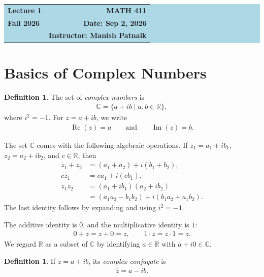 \documentclass[11pt]{article}
\theoremstyle{plain}
\theoremstyle{definition}
\newtheorem{definition}[theorem]{Definition}
\theoremstyle{remark}
\numberwithin{equation}{section}
\newcommand{\be}{\begin{eqnarray}}
\newcommand{\ee}{\end{eqnarray}}
\newcommand{\C}{\mathbb{C}}
\newcommand{\R}{\mathbb{R}}
\newcommand{\RePart}{\operatorname{Re}}
\newcommand{\ImPart}{\operatorname{Im}}
\begin{document}
\begin{center}
  \colorbox{lightblue}{%
    \begin{minipage}{0.94\textwidth}
      \vspace{0.55em}
      \begin{tabular*}{\textwidth}{@{\extracolsep{\fill}}lr}
        {\color{courseblue}\bfseries\LARGE Lecture 1} &
        {\color{courseblue}\bfseries\LARGE MATH 411}\\[0.35em]
        \textbf{Fall 2026} & \textbf{Date: Sep 2, 2026}\\
        & \textbf{Instructor: Manish Patnaik}
      \end{tabular*}
      \vspace{0.45em}
    \end{minipage}}
\end{center}

\tableofcontents
\vspace{0.45em}



\section{Basics of Complex Numbers}


\begin{definition}
The set of \emph{complex numbers} is
\be
  \C=\{a+ib\mid a,b\in\R\},
\ee
where $i^2=-1$.  For $z=a+ib$, we write
\be
  \RePart(z)=a \qquad\text{and}\qquad \ImPart(z)=b.
\ee
\end{definition}

The set $\C$ comes with the following algebraic operations.  If
$z_1=a_1+ib_1$, $z_2=a_2+ib_2$, and $c\in\R$, then
\begin{align}
  z_1+z_2
    &= (a_1+a_2)+i(b_1+b_2),\\
  c z_1
    &= ca_1+i(cb_1),\\
  z_1z_2
    &= (a_1+ib_1)(a_2+ib_2)\\
    &= (a_1a_2-b_1b_2)+i(b_1a_2+a_1b_2).
\end{align}
The last identity follows by expanding and using $i^2=-1$.

The additive identity is $0$, and the multiplicative identity is $1$:
\be
  0+z=z+0=z,
  \qquad
  1\cdot z=z\cdot 1=z.
\ee
We regard $\R$ as a subset of $\C$ by identifying $a\in\R$ with
$a+i0\in\C$.

\begin{definition}
If $z=a+ib$, its \emph{complex conjugate} is
\be
  \overline{z}=a-ib.
\ee
\end{definition}
\end{document}
